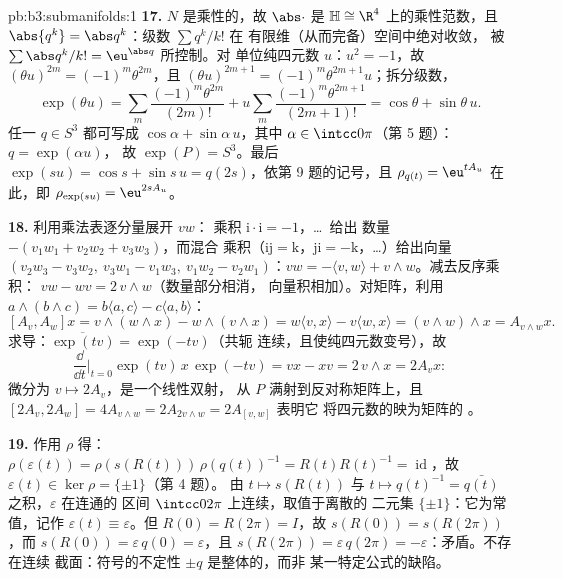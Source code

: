 \begin{solution}{pb:b3:submanifolds:1}
\textbf{17.} $N$ 是乘性的，故 $\abs\cdot$ 是
$\mathbb H \cong \R^4$ 上的乘性范数，且
$\abs{q^k} = \abs q^k$：级数 $\sum q^k/k!$ 在
有限维（从而完备）空间中绝对收敛，
被 $\sum\abs q^k/k! = \eu^{\abs q}$ 所控制。对
单位纯四元数 $u$：$u^2 = -1$，故 $(\theta u)^{2m} =
(-1)^m\theta^{2m}$，且 $(\theta u)^{2m+1} =
(-1)^m\theta^{2m+1}u$；拆分级数，
\[
\exp(\theta u) = \sum_m\frac{(-1)^m\theta^{2m}}{(2m)!} +
u\sum_m\frac{(-1)^m\theta^{2m+1}}{(2m+1)!} = \cos\theta +
\sin\theta\,u .
\]
任一 $q \in S^3$ 都可写成 $\cos\alpha + \sin\alpha\,u$，其中
$\alpha \in \intcc0\pi$（第 5 题）：$q = \exp(\alpha u)$，
故 $\exp(P) = S^3$。最后 $\exp(su) = \cos s + \sin s\,u
= q(2s)$，依第 9 题的记号，且 $\rho_{q(t)} =
\eu^{tA_u}$ 在此，即 $\rho_{\exp(su)} = \eu^{2sA_u}$。

\textbf{18.} 利用乘法表逐分量展开 $vw$：
乘积 $\mathrm i\cdot\mathrm i = -1$，\dots\ 给出
数量 $-(v_1w_1 + v_2w_2 + v_3w_3)$，而混合
乘积（$\mathrm{ij} = \mathrm k$，$\mathrm{ji} =
-\mathrm k$，\dots）给出向量 $(v_2w_3 - v_3w_2,\
v_3w_1 - v_1w_3,\ v_1w_2 - v_2w_1)$：$vw = -\langle v,
w\rangle + v\wedge w$。减去反序乘积：
$vw - wv = 2\,v\wedge w$（数量部分相消，
向量积相加）。对矩阵，利用 $a\wedge(b\wedge
c) = b\langle a, c\rangle - c\langle a, b\rangle$：
\[
[A_v, A_w]x = v\wedge(w\wedge x) - w\wedge(v\wedge x)
= w\langle v, x\rangle - v\langle w, x\rangle
= (v\wedge w)\wedge x = A_{v\wedge w}x .
\]
求导：$\overline{\exp(tv)} = \exp(-tv)$（共轭
连续，且使纯四元数变号），故
\[
\frac{\dd}{\dd t}\Bigr|_{t=0}\exp(tv)\,x\,\exp(-tv) = vx -
xv = 2\,v\wedge x = 2A_vx :
\]
微分为 $v \mapsto 2A_v$，是一个线性双射，
从 $P$ 满射到反对称矩阵上，且 $[2A_v, 2A_w]
= 4A_{v\wedge w} = 2A_{2v\wedge w} = 2A_{[v,w]}$ 表明它
将四元数的映为矩阵的
\omterm{def:b3:groups:derived}{换位子}。

\textbf{19.} 作用 $\rho$ 得：$\rho(\varepsilon(t)) =
\rho(s(R(t)))\,\rho(q(t))^{-1} = R(t)R(t)^{-1} =
\operatorname{id}$，故 $\varepsilon(t) \in \ker\rho =
\{\pm1\}$（第 4 题）。
由 $t \mapsto s(R(t))$ 与 $t \mapsto q(t)^{-1} =
\bar{q(t)}$ 之积，$\varepsilon$ 在连通的
区间 $\intcc0{2\pi}$ 上连续，取值于离散的
二元集 $\{\pm1\}$：它为常值，记作 $\varepsilon(t) \equiv
\varepsilon$。但 $R(0) = R(2\pi) = I$，故 $s(R(0)) =
s(R(2\pi))$，而 $s(R(0)) = \varepsilon\,q(0) =
\varepsilon$，且 $s(R(2\pi)) = \varepsilon\,q(2\pi) =
-\varepsilon$：矛盾。不存在连续
截面：符号的不定性 $\pm q$ 是整体的，而非
某一特定公式的缺陷。


\end{solution}
